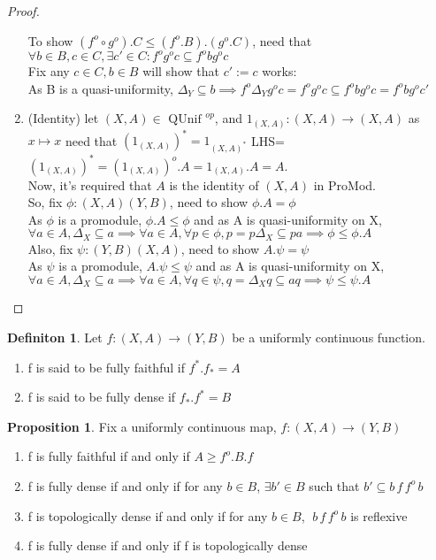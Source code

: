 \documentclass[18pt,a4paper]{article}
\makeatletter
\theoremstyle{definition}
\newtheorem{definition}{Definiton}[section]
\newtheorem{proop}{Proposition}[section]
\newcommand{\carrow}{}%
\DeclareRobustCommand{\carrow}{%
	\mathrel{\vphantom{\rightarrow}\mathpalette\circle@arrow\relax}%
}
\newcommand{\circle@arrow}[2]{%
	\m@th
	\ooalign{%
		\hidewidth$#1\circ\mkern1mu$\hidewidth\cr
	$#1\longrightarrow$\cr}%
}
\makeatother
\begin{document}
\begin{proof}
\begin{enumerate}[label=(\roman*)]
				To show $(f^o \circ g^o).C\leq(f^o .B).(g^o .C)$, need that
				$\forall b \in B, c \in C, \exists c' \in C: f^o g^o c \subseteq f^obg^oc $
				\\Fix any $c\in C, b\in B$ will show that $c':=c$ works:\\
				As B is a quasi-uniformity, $\Delta_Y \subseteq b\implies f^o \Delta_Y
				g^o c=f^o g^o c \subseteq f^o b	g^o c=f^o b g^o c'$
			\item(Identity) let $(X,A)\in \text{ QUnif }^{op} $, and
				$1_{(X,A)}:(X,A)\to(X,A)$ as $x\mapsto x$ need that
				$(1_{(X,A)})^*=1_{(X,A)^*}$
				LHS=$(1_{(X,A)})^*=(1_{(X,A)})^o.A=1_{(X,A)}.A=A$.
				\\Now, it's required that $A$ is the identity of $(X,A)$ in ProMod.\\
				So, fix $\phi:(X,A) \carrow (Y,B)$, need to show $\phi.A=\phi$\\
				As $\phi$ is a promodule, $\phi.A \leq \phi$ and as A is quasi-uniformity on X,\\
				$\forall a\in A, \Delta_X \subseteq a \implies
				\forall a \in A, \forall p \in \phi, p=p\Delta_X\subseteq pa \implies
				\phi \leq \phi.A$\\
				Also, fix $\psi:(Y,B) \carrow (X,A)$, need to show $A.\psi=\psi$\\
				As $\psi$ is a promodule, $A.\psi \leq \psi$ and as A is quasi-uniformity on X,\\
				$\forall a\in A, \Delta_X \subseteq a \implies
				\forall a \in A, \forall q \in \psi, q=\Delta_X q \subseteq aq \implies
				\psi \leq \psi.A$
		\end{enumerate}



	\end{proof}
	\begin{definition} %
		Let $f:(X,A) \to (Y,B)$ be a uniformly continuous function.
		\begin{enumerate}[label=\Roman*]
			\item f is said to be fully faithful if	$f^* .f_*=A $
			\item f is said to be fully dense if $f_* .f^*=B $
		\end{enumerate}
	\end{definition}
	\begin{proop}
		Fix a uniformly continuous map, $f:(X,A) \rightarrow (Y,B)$
		\begin{enumerate}[label=(\alph*)]
			\item f is fully faithful if and only if $A\geq f^o.B.f$
			\item f is fully dense if and only if for any $b\in B$, $\exists b' \in B$
				such that $b' \subseteq b\,f\,f^o \,b$
			\item f is topologically dense if and only if for any $b\in B$,
				$\; b \, f\, f^o\,b$ is reflexive
			\item f is fully dense if and only if f is topologically dense
		\end{enumerate}
	\end{proop}
\end{document}
